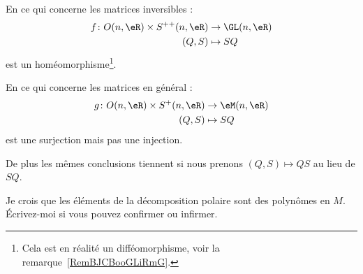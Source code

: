 \begin{theorem} \label{ThoLHebUAU}
	En ce qui concerne les matrices inversibles :
	\begin{equation}
		\begin{aligned}
			f\colon O(n,\eR)\times S^{++}(n,\eR) & \to \GL(n,\eR) \\
			(Q,S)                                & \mapsto SQ
		\end{aligned}
	\end{equation}
	est un homéomorphisme\footnote{Cela est en réalité un difféomorphisme, voir la remarque~\ref{RemBJCBooGLiRmG}.}.

	En ce qui concerne les matrices en général :
	\begin{equation}
		\begin{aligned}
			g\colon O(n,\eR)\times S^+(n,\eR) & \to \eM(n,\eR) \\
			(Q,S)                             & \mapsto SQ
		\end{aligned}
	\end{equation}
	est une surjection mais pas une injection.

	De plus les mêmes conclusions tiennent si nous prenons \( (Q,S)\mapsto QS\) au lieu de \( SQ\).
\end{theorem}


\begin{probleme}
	Je crois que les éléments de la décomposition polaire sont des polynômes en \( M\). Écrivez-moi si vous pouvez confirmer ou infirmer.
\end{probleme}

